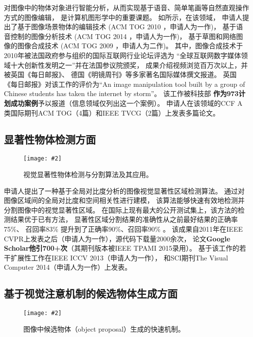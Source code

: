 \documentclass[12pt]{article}
\newcommand{\addImg}[2][1.0]{\texttt{[image: \#2]}}
\newcommand{\myEmph}[1]{\textbf{\textcolor[rgb]{0,0,0.25}{#1}}}
\begin{document}
对图像中的物体对象进行智能分析，从而实现基于语音、简单笔画等自然直观操作方式的图像编辑，
是计算机图形学中的重要课题。
如所示，在该领域，
申请人提出了基于图像场景物体的编辑技术
(ACM TOG 2010 \cite{ChengZMHH10}，申请人为一作)，
基于语音控制的图像分析技术 
(ACM TOG 2014 \cite{cheng2014imagespirit}，申请人为一作)，
基于草图和网络图像的图像合成技术
(ACM TOG 2009 \cite{cheng2014imagespirit}，申请人为二作)。
其中，图像合成技术于2010年被法国政府参与组织的国际互联网行业论坛评选为
“全球互联网数字媒体领域十大创新性发明之一”并在法国参议院颁奖，
成果介绍视频浏览百万次以上，并被英国《每日邮报》、
德国《明镜周刊》等多家著名国际媒体撰文报道。
英国《每日邮报》对该工作的评价为“An image manipulation tool built by a group 
of Chinese students has taken the internet by storm”。
该工作被科技部 \cite{sketch2PhotoMost} 
\myEmph{作为973计划成功案例}予以报道（信息领域仅列出这一个案例）。
申请人在该领域的CCF A类国际期刊ACM TOG（4篇）和IEEE TVCG（2篇）上发表多篇论文。

\subsection{显著性物体检测方面}

\begin{figure}[ht]
    \centering
    \addImg[1]{figures/sal.jpg}
    \caption{视觉显著性物体检测与分割算法及其应用。}
    \label{fig:salobj}
\end{figure}

申请人提出了一种基于全局对比度分析的图像视觉显著性区域检测算法。
通过对图像区域间的全局对比度和空间相关性进行建模，
该算法能够快速有效地检测并分割图像中的视觉显著性区域。
在国际上现有最大的公开测试集上，该方法的检测结果优于已有方法，
显著性区域分割结果的准确性从之前最好结果的正确率75\%、
召回率83\% 提升到了正确率90\%、召回率90\% 。
该成果自2011年在IEEE CVPR上发表之后（申请人为一作），源代码下载量2000余次，
论文\myEmph{Google Scholar他引700+次}（其期刊版本被IEEE TPAMI 2015录用）。
基于该工作的若干扩展性工作在IEEE ICCV 2013（申请人为一作），
和SCI期刊The Visual Computer 2014（申请人为一作）上发表。


\subsection{基于视觉注意机制的候选物体生成方面}

\begin{figure}[ht]
    \centering
    \addImg[.8]{figures/Objectness.jpg}
    \caption{图像中候选物体（object proposal）生成的快速机制。}
    \label{fig:objectness}
\end{figure}
\end{document}
